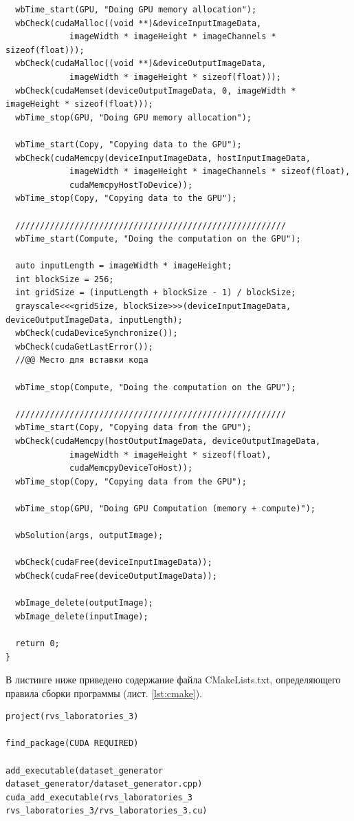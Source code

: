 \documentclass[14pt]{extarticle}
\newenvironment{code}{\captionsetup{type=listing, belowskip=-14pt plus 3pt minus 0pt}}{}
\begin{document}
\begin{code}
\begin{verbatim}
  wbTime_start(GPU, "Doing GPU memory allocation");
  wbCheck(cudaMalloc((void **)&deviceInputImageData,
             imageWidth * imageHeight * imageChannels * sizeof(float)));
  wbCheck(cudaMalloc((void **)&deviceOutputImageData,
             imageWidth * imageHeight * sizeof(float)));
  wbCheck(cudaMemset(deviceOutputImageData, 0, imageWidth * imageHeight * sizeof(float)));
  wbTime_stop(GPU, "Doing GPU memory allocation");

  wbTime_start(Copy, "Copying data to the GPU");
  wbCheck(cudaMemcpy(deviceInputImageData, hostInputImageData,
             imageWidth * imageHeight * imageChannels * sizeof(float),
             cudaMemcpyHostToDevice));
  wbTime_stop(Copy, "Copying data to the GPU");

  ///////////////////////////////////////////////////////
  wbTime_start(Compute, "Doing the computation on the GPU");
  
  auto inputLength = imageWidth * imageHeight;
  int blockSize = 256;
  int gridSize = (inputLength + blockSize - 1) / blockSize;
  grayscale<<<gridSize, blockSize>>>(deviceInputImageData, deviceOutputImageData, inputLength);
  wbCheck(cudaDeviceSynchronize());
  wbCheck(cudaGetLastError());
  //@@ Место для вставки кода

  wbTime_stop(Compute, "Doing the computation on the GPU");

  ///////////////////////////////////////////////////////
  wbTime_start(Copy, "Copying data from the GPU");
  wbCheck(cudaMemcpy(hostOutputImageData, deviceOutputImageData,
             imageWidth * imageHeight * sizeof(float),
             cudaMemcpyDeviceToHost));
  wbTime_stop(Copy, "Copying data from the GPU");

  wbTime_stop(GPU, "Doing GPU Computation (memory + compute)");

  wbSolution(args, outputImage);

  wbCheck(cudaFree(deviceInputImageData));
  wbCheck(cudaFree(deviceOutputImageData));

  wbImage_delete(outputImage);
  wbImage_delete(inputImage);

  return 0;
}
\end{verbatim}
\end{code}

\pagebreak

В листинге ниже приведено содержание файла CMakeLists.txt, определяющего правила сборки программы (лист. \ref{lst:cmake}).

\begin{code}    
\caption{Содержание CMakeLists.txt\label{lst:cmake}}
\begin{verbatim}
project(rvs_laboratories_3)

find_package(CUDA REQUIRED)

add_executable(dataset_generator dataset_generator/dataset_generator.cpp)
cuda_add_executable(rvs_laboratories_3 rvs_laboratories_3/rvs_laboratories_3.cu)
\end{verbatim}
\end{code}
\end{document}
